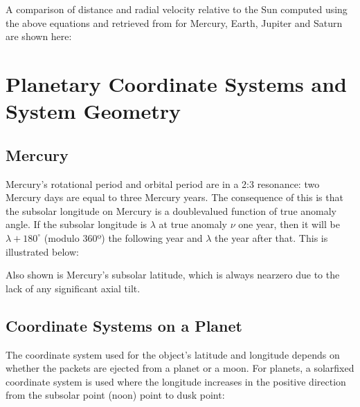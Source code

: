 \documentclass[letterpaper,10pt,english]{sphinxmanual}
\begin{document}
\sphinxAtStartPar
A comparison of distance and radial velocity relative to the Sun computed
using the above equations and retrieved from
for Mercury, Earth, Jupiter and Saturn are shown here:

\noindent{}

\noindent{}

\noindent{}

\noindent{}

\sphinxstepscope


\section{Planetary Coordinate Systems and System Geometry}
\label{\detokenize{nexoclom2/coordinate_systems:planetary-coordinate-systems-and-system-geometry}}\label{\detokenize{nexoclom2/coordinate_systems:coordinate-systems}}\label{\detokenize{nexoclom2/coordinate_systems::doc}}

\subsection{Mercury}
\label{\detokenize{nexoclom2/coordinate_systems:mercury}}
\sphinxAtStartPar
Mercury’s rotational period and orbital period are in a 2:3 resonance: two
Mercury days are equal to three Mercury years. The consequence of this is that
the sub\sphinxhyphen{}solar longitude on Mercury is a double\sphinxhyphen{}valued function of true anomaly
angle. If the sub\sphinxhyphen{}solar longitude is \(\lambda\) at true anomaly \(\nu\)
one year, then it will be \(\lambda + 180^\circ\) (modulo 360º) the
following year and \(\lambda\) the year after that. This is illustrated
below:

\noindent{}

\sphinxAtStartPar
Also shown is Mercury’s sub\sphinxhyphen{}solar latitude, which is always near\sphinxhyphen{}zero due to the
lack of any significant axial tilt.


\subsection{Coordinate Systems on a Planet}
\label{\detokenize{nexoclom2/coordinate_systems:coordinate-systems-on-a-planet}}
\sphinxAtStartPar
The coordinate system used for the object’s latitude and longitude depends
on whether the packets are ejected from a planet or a moon. For planets, a
solar\sphinxhyphen{}fixed coordinate system is used where the longitude increases in the
positive direction from the sub\sphinxhyphen{}solar point (noon) point to dusk point:
\end{document}
